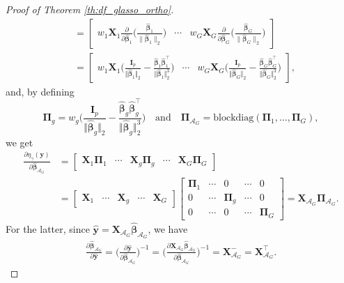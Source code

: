 \documentclass[a4paper, 12pt]{article}
\newcommand{\Aset}{\mathcal{A}}
\newcommand{\betahat}{\widehat{\boldsymbol\beta}}
\newcommand{\T}{\top}
\def\bbeta{\boldsymbol{\beta}}
\def\bPi{\boldsymbol{\Pi}}
\def\by{\boldsymbol{y}}
\def\bI{\mathbf{I}}
\def\bX{\mathbf{X}}
\def\by{\mathbf{y}}
\begin{document}
\begin{appendix}
\begin{proof}[Proof of Theorem \ref{th:df_glasso_ortho}]
\begin{equation*}
\begin{aligned}
&= \begin{bmatrix} w_1 \bX_1\frac{\partial}{\partial\betahat_1}\Big(\frac{ \betahat_1}{\| \betahat_1 \|_2}\Big) &\cdots& w_G \bX_G\frac{\partial}{\partial\betahat_G}\Big(\frac{ \betahat_G}{\| \betahat_G \|_2}\Big)
\end{bmatrix}\\
&= \begin{bmatrix}w_1\bX_1\Bigg(\frac{\bI_{p}}{\Vert\betahat_1\Vert_2}-\frac{\betahat_1\betahat_1^{\T}}{\Vert\betahat_1\Vert_2^3}\Bigg) & \cdots & w_G\bX_G\Bigg(\frac{\bI_{p}}{\Vert\betahat_G\Vert_2}-\frac{\betahat_G\betahat_G^{\T}}{\Vert\betahat_G\Vert_2^3}\Bigg)
\end{bmatrix},
\end{aligned}
\end{equation*}
and, by defining
\begin{equation}
\label{eq:Pi_Aset_definition}
\bPi_g = w_g \Bigg(\frac{\bI_{p}}{\Vert\betahat_g\Vert_2}-\frac{\betahat_g\betahat_g^{\T}}{\Vert\betahat_g\Vert_2^3}\Bigg) \quad \text{and} \quad \bPi_{\Aset_G} = \mathrm{blockdiag}(\bPi_1, \ldots, \bPi_G),
\end{equation}
we get
\begin{equation*}
\begin{aligned}
\frac{\partial \eta_\gamma(\by)}{\partial\betahat_{\Aset_G}} 
&=\begin{bmatrix}
\bX_1\bPi_1 & \cdots &\bX_g\bPi_g&\cdots&\bX_G\bPi_G
\end{bmatrix}\\
&= \begin{bmatrix}
\bX_1 & \cdots &\bX_g&\cdots&\bX_G
\end{bmatrix}
\begin{bmatrix}
\bPi_1 & \cdots & 0 & \cdots & 0\\
0 & \cdots & \bPi_g & \cdots & 0 \\
0 & \cdots & 0 & \cdots &\bPi_G
\end{bmatrix}= \bX_{\Aset_G} \bPi_{\Aset_G}.
\end{aligned}
\end{equation*}
For the latter, since $\widehat{\by}=\bX_{\Aset_G}\betahat_{\Aset_G}$, we have
\begin{equation*}
\begin{aligned}
\frac{\partial\betahat_{\Aset_G}}{\partial \widehat{\by}}=  
\bigg(\frac{\partial \widehat{\by}}{\partial\betahat_{\Aset_G}}\bigg)^{-1} = \bigg( \frac{\partial \bX_{\Aset_G}\widehat{\bbeta}_{\Aset_G}}{\partial \widehat{\bbeta}_{\Aset_G}}\bigg)^{-1} = \bX_{\Aset_G}^-=\bX_{\Aset_G}^{\T}.

\end{aligned}
\end{equation*}
\end{proof}
\end{appendix}
\end{document}

